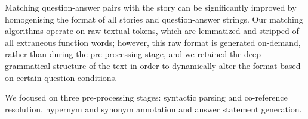 Matching question-answer pairs with the story can be significantly improved by homogenising the format of all stories and question-answer strings. Our matching algorithms operate on raw textual tokens, which are lemmatized and stripped of all extraneous function words; however, this raw format is generated on-demand, rather than during the pre-processing stage, and we retained the deep grammatical structure of the text in order to dynamically alter the format based on certain question conditions.

We focused on three pre-processing stages: syntactic parsing and co-reference resolution, hypernym and synonym annotation and answer statement generation.